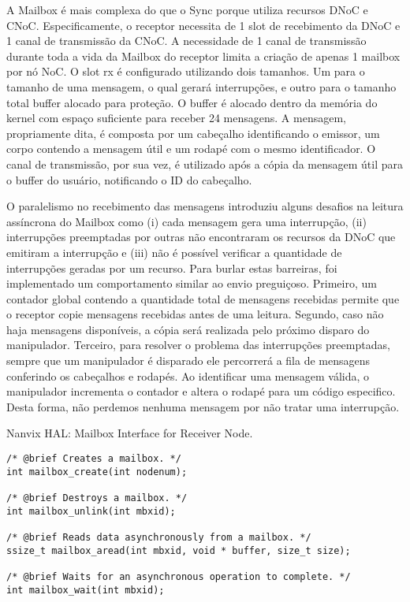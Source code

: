 				A Mailbox é mais complexa do que o Sync porque utiliza recursos DNoC e CNoC.
				Especificamente, o receptor necessita de 1 slot de recebimento da DNoC e 1 canal de transmissão da CNoC.
				A necessidade de 1 canal de transmissão durante toda a vida da Mailbox do receptor limita a criação de apenas 1 mailbox por nó NoC.
				O slot rx é configurado utilizando dois tamanhos.
				Um para o tamanho de uma mensagem, o qual gerará interrupções, e outro para o tamanho total buffer alocado para proteção.
				O buffer é alocado dentro da memória do kernel com espaço suficiente para receber 24 mensagens.
				A mensagem, propriamente dita, é composta por um cabeçalho identificando o emissor, um corpo contendo a mensagem útil e um rodapé com o mesmo identificador.
				O canal de transmissão, por sua vez, é utilizado após a cópia da mensagem útil para o buffer do usuário, notificando o ID do cabeçalho.

				O paralelismo no recebimento das mensagens introduziu alguns desafios na leitura assíncrona do Mailbox como 
				(i) cada mensagem gera uma interrupção,
				(ii) interrupções preemptadas por outras não encontraram os recursos da DNoC que emitiram a interrupção e
				(iii) não é possível verificar a quantidade de interrupções geradas por um recurso.
				Para burlar estas barreiras, foi implementado um comportamento similar ao envio preguiçoso.
				Primeiro, um contador global contendo a quantidade total de mensagens recebidas permite que o receptor copie mensagens recebidas antes de uma leitura.
				Segundo, caso não haja mensagens disponíveis, a cópia será realizada pelo próximo disparo do manipulador.
				Terceiro, para resolver o problema das interrupções preemptadas, sempre que um manipulador é disparado ele percorrerá a fila de mensagens conferindo os cabeçalhos e rodapés.
				Ao identificar uma mensagem válida, o manipulador incrementa o contador e altera o rodapé para um código especifico.
				Desta forma, não perdemos nenhuma mensagem por não tratar uma interrupção.

\begin{listing}[!tb]
\caption{Nanvix HAL: Mailbox Interface for Receiver Node.}
\label{code:hal-mailbox-receiver}
\begin{verbatim}
/* @brief Creates a mailbox. */
int mailbox_create(int nodenum);

/* @brief Destroys a mailbox. */
int mailbox_unlink(int mbxid);

/* @brief Reads data asynchronously from a mailbox. */
ssize_t mailbox_aread(int mbxid, void * buffer, size_t size);

/* @brief Waits for an asynchronous operation to complete. */
int mailbox_wait(int mbxid);
\end{verbatim}
\end{listing}

